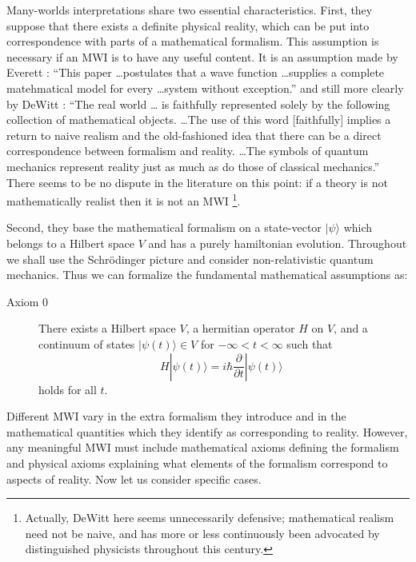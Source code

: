 \documentclass[aps,pra,12pt]{revtex4}
\def\ket#1{| #1\rangle}
\begin{document}
Many-worlds interpretations share two essential characteristics.
First, they suppose that there exists a definite physical reality,
which can be put into correspondence with parts of a mathematical
formalism.  This assumption is necessary if an MWI is to have any
useful content. It is an assumption made by Everett \cite{ev}: ``This paper
\ldots postulates that a wave function \ldots supplies a complete
matehmatical model for every \ldots system without exception.'' and
still more clearly by DeWitt \cite{dew}: ``The real world \ldots
is faithfully represented solely by the following collection of 
mathematical objects. \ldots The use of this word [faithfully] implies
a return to naive realism and the old-fashioned idea that there can be a 
direct correspondence between formalism and reality. \ldots The symbols
of quantum mechanics represent reality just as much as do those of 
classical mechanics.'' There seems to be no dispute in the literature on this point: if a theory
is not mathematically realist then it is not an MWI  \footnote{Actually, DeWitt here seems 
unnecessarily defensive; mathematical realism need not be naive, and has more 
or less continuously been advocated by distinguished physicists 
throughout this century.}.

Second, they base the mathematical formalism on a state-vector
$\ket{\psi}$ which belongs to a Hilbert space $V$ and has a purely
hamiltonian evolution.  Throughout we shall use the Schr\"{o}dinger
picture and consider non-relativistic quantum mechanics.  Thus we can
formalize the fundamental mathematical assumptions as:
\begin{description}
\item[Axiom $0$]  There exists a Hilbert space $V$, a hermitian operator $H$ on
$V$, and a continuum of states $\ket{ \psi (t) } \in V$ for $-\infty <
t < \infty$ such that
\begin{equation}\label{schrod}
H \ket{ \psi (t) } = i \hbar \frac{ \partial }{\partial t} \ket{ \psi
(t) }~~
\end{equation}
holds for all $t$.
\end{description}

Different MWI vary in the extra formalism they introduce and in the
mathematical quantities which they identify as corresponding to
reality.  However, any meaningful MWI must include mathematical axioms
defining the formalism and physical axioms explaining what elements of
the formalism correspond to aspects of reality.  Now let us consider
specific cases.
\end{document}

